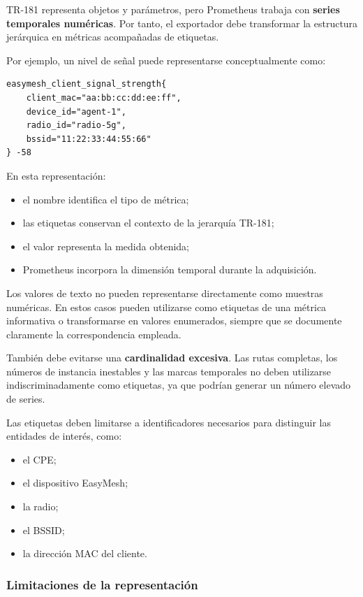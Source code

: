 TR-181 representa objetos y parámetros, pero Prometheus trabaja con
\textbf{series temporales numéricas}. Por tanto, el exportador debe
transformar la estructura jerárquica en métricas acompañadas de
etiquetas.

Por ejemplo, un nivel de señal puede representarse conceptualmente como:

\begin{verbatim}
easymesh_client_signal_strength{
    client_mac="aa:bb:cc:dd:ee:ff",
    device_id="agent-1",
    radio_id="radio-5g",
    bssid="11:22:33:44:55:66"
} -58
\end{verbatim}

En esta representación:

\begin{itemize}
    \item el nombre identifica el tipo de métrica;
    \item las etiquetas conservan el contexto de la jerarquía TR-181;
    \item el valor representa la medida obtenida;
    \item Prometheus incorpora la dimensión temporal durante la
    adquisición.
\end{itemize}

Los valores de texto no pueden representarse directamente como muestras
numéricas. En estos casos pueden utilizarse como etiquetas de una métrica
informativa o transformarse en valores enumerados, siempre que se
documente claramente la correspondencia empleada.

También debe evitarse una
\textbf{cardinalidad excesiva}. Las rutas completas, los números de
instancia inestables y las marcas temporales no deben utilizarse
indiscriminadamente como etiquetas, ya que podrían generar un número
elevado de series.

Las etiquetas deben limitarse a identificadores necesarios para
distinguir las entidades de interés, como:

\begin{itemize}
    \item el CPE;
    \item el dispositivo EasyMesh;
    \item la radio;
    \item el BSSID;
    \item la dirección MAC del cliente.
\end{itemize}


\subsubsection*{Limitaciones de la representación}

